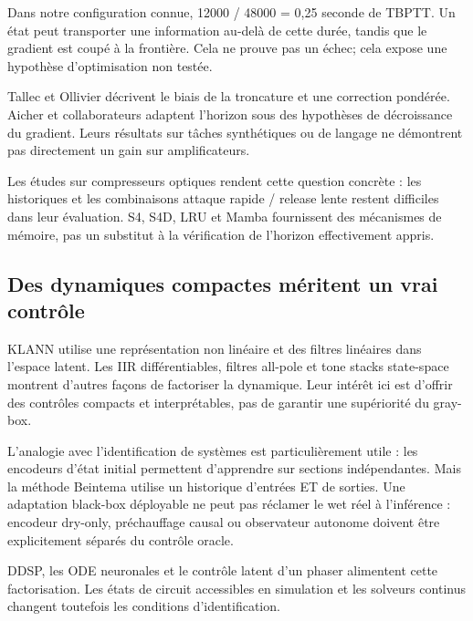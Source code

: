 \documentclass[10pt,a4paper]{article}
\begin{document}
Dans notre configuration connue, 12000 / 48000 = 0,25 seconde de TBPTT. Un \'{e}tat peut transporter
une information au-del\`{a} de cette dur\'{e}e, tandis que le gradient est coup\'{e} \`{a} la fronti\`{e}re.
Cela ne prouve pas un \'{e}chec; cela expose une hypoth\`{e}se d'optimisation non test\'{e}e.

Tallec et Ollivier d\'{e}crivent le biais de la troncature et une correction pond\'{e}r\'{e}e.
Aicher et collaborateurs adaptent l'horizon sous des hypoth\`{e}ses de d\'{e}croissance du gradient.
Leurs r\'{e}sultats sur t\^{a}ches synth\'{e}tiques ou de langage ne d\'{e}montrent pas directement un gain
sur amplificateurs. \cite{tallec2017,aicher2020}

Les \'{e}tudes sur compresseurs optiques rendent cette question concr\`{e}te : les historiques et
les combinaisons attaque rapide / release lente restent difficiles dans leur \'{e}valuation.
S4, S4D, LRU et Mamba fournissent des m\'{e}canismes de m\'{e}moire, pas un substitut \`{a} la v\'{e}rification
de l'horizon effectivement appris. \cite{simionato2024b,gu2021,gu2022,orvieto2023,gu2023}

\subsection{Des dynamiques compactes m\'{e}ritent un vrai contr\^{o}le}

KLANN utilise une repr\'{e}sentation non lin\'{e}aire et des filtres lin\'{e}aires dans l'espace latent.
Les IIR diff\'{e}rentiables, filtres all-pole et tone stacks state-space montrent d'autres fa\c{c}ons
de factoriser la dynamique. Leur int\'{e}r\^{e}t ici est d'offrir des contr\^{o}les compacts et interpr\'{e}tables,
pas de garantir une sup\'{e}riorit\'{e} du gray-box. \cite{huhtala2024,kuznetsov2020,yu2024,sinjanakhom2024}

L'analogie avec l'identification de syst\`{e}mes est particuli\`{e}rement utile : les encodeurs d'\'{e}tat
initial permettent d'apprendre sur sections ind\'{e}pendantes. Mais la m\'{e}thode Beintema utilise
un historique d'entr\'{e}es ET de sorties. Une adaptation black-box d\'{e}ployable ne peut pas r\'{e}clamer
le wet r\'{e}el \`{a} l'inf\'{e}rence : encodeur dry-only, pr\'{e}chauffage causal ou observateur autonome
doivent \^{e}tre explicitement s\'{e}par\'{e}s du contr\^{o}le oracle. \cite{beintema2021}

DDSP, les ODE neuronales et le contr\^{o}le latent d'un phaser alimentent cette factorisation.
Les \'{e}tats de circuit accessibles en simulation et les solveurs continus changent toutefois
les conditions d'identification. \cite{engel2020,parker2019,wilczek2022,carson2023}
\end{document}
